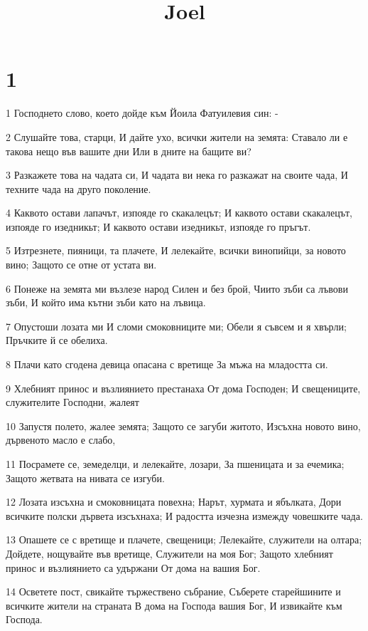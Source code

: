 

\title{Joel}


\chapter{1}

\par 1 Господнето слово, което дойде към Йоила Фатуилевия син: -
\par 2 Слушайте това, старци, И дайте ухо, всички жители на земята: Ставало ли е такова нещо във вашите дни Или в дните на бащите ви?
\par 3 Разкажете това на чадата си, И чадата ви нека го разкажат на своите чада, И техните чада на друго поколение.
\par 4 Каквото остави лапачът, изпояде го скакалецът; И каквото остави скакалецът, изпояде го изедникьт; И каквото остави изедникьт, изпояде го пръгът.
\par 5 Изтрезнете, пияници, та плачете, И лелекайте, всички винопийци, за новото вино; Защото се отне от устата ви.
\par 6 Понеже на земята ми възлезе народ Силен и без брой, Чиито зъби са лъвови зъби, И който има кътни зъби като на лъвица.
\par 7 Опустоши лозата ми И сломи смоковниците ми; Обели я съвсем и я хвърли; Пръчките й се обелиха.
\par 8 Плачи като сгодена девица опасана с вретище За мъжа на младостта си.
\par 9 Хлебният принос и възлиянието престанаха От дома Господен; И свещениците, служителите Господни, жалеят
\par 10 Запустя полето, жалее земята; Защото се загуби житото, Изсъхна новото вино, дървеното масло е слабо,
\par 11 Посрамете се, земеделци, и лелекайте, лозари, За пшеницата и за ечемика; Защото жетвата на нивата се изгуби.
\par 12 Лозата изсъхна и смоковницата повехна; Нарът, хурмата и ябълката, Дори всичките полски дървета изсъхнаха; И радостта изчезна измежду човешките чада.
\par 13 Опашете се с вретище и плачете, свещеници; Лелекайте, служители на олтара; Дойдете, нощувайте във вретище, Служители на моя Бог; Защото хлебният принос и възлиянието са удържани От дома на вашия Бог.
\par 14 Осветете пост, свикайте тържествено събрание, Съберете старейшините и всичките жители на страната В дома на Господа вашия Бог, И извикайте към Господа.

